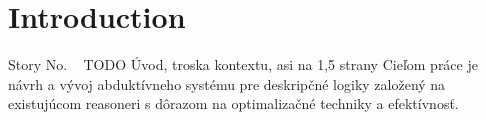 \chapter{Introduction}\label{chap:intro}
{Story No. \ \thechapter} 
TODO
Úvod, troska kontextu, asi na 1,5 strany
Cieľom práce je návrh a vývoj abduktívneho systému pre deskripčné logiky založený na existujúcom reasoneri s dôrazom na optimalizačné techniky a efektívnosť.